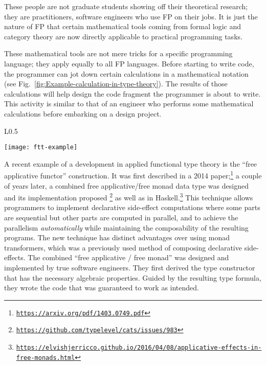 These people are not graduate students showing off their theoretical
research; they are practitioners, software engineers who use FP on
their jobs. It is just the nature of FP that certain mathematical
tools \textemdash{} coming from formal logic and category theory \textemdash{}
are now directly applicable to practical programming tasks.

These mathematical tools are not mere tricks for a specific programming
language; they apply equally to all FP languages. Before starting
to write code, the programmer can jot down certain calculations in
a mathematical notation (see Fig.\ \ref{fig:Example-calculation-in-type-theory}).
The results of those calculations will help design the code fragment
the programmer is about to write. This activity is similar to that
of an engineer who performs some mathematical calculations before
embarking on a design project. \begin{wrapfigure}{L}{0.5\textwidth}%
\begin{centering}
{\footnotesize{}\vspace{0.25\baselineskip}
\texttt{[image: ftt-example]}\vspace{-0.25\baselineskip}
}{\footnotesize\par}
\par\end{centering}
{\footnotesize{}\caption{A programmer performs a derivation before writing Haskell code.\label{fig:Example-calculation-in-type-theory}}
}{\footnotesize\par}

\vspace{-0.5\baselineskip}
\end{wrapfigure}%
 

\noindent A recent example of a development in applied functional
type theory is the \textsf{``}free applicative functor\textsf{''} construction. It
was first described in a 2014 paper;\footnote{\texttt{\href{https://arxiv.org/pdf/1403.0749.pdf}{https://arxiv.org/pdf/1403.0749.pdf}}}
a couple of years later, a combined free applicative/free monad data
type was designed and its implementation proposed \footnote{\texttt{\href{https://github.com/typelevel/cats/issues/983}{https://github.com/typelevel/cats/issues/983}}}
as well as in Haskell.\footnote{\texttt{\href{https://elvishjerricco.github.io/2016/04/08/applicative-effects-in-free-monads.html}{https://elvishjerricco.github.io/2016/04/08/applicative-effects-in-free-monads.html}}}
This technique allows programmers to implement declarative side-effect
computations where some parts are sequential but other parts are computed
in parallel, and to achieve the parallelism \emph{automatically} while
maintaining the composability of the resulting programs. The new technique
has distinct advantages over using monad transformers, which was a
previously used method of composing declarative side-effects. The
combined \textsf{``}free applicative / free monad\textsf{''} was designed and implemented
by true software engineers. They first derived the type constructor
that has the necessary algebraic properties. Guided by the resulting
type formula, they wrote the code that was guaranteed to work as intended.

